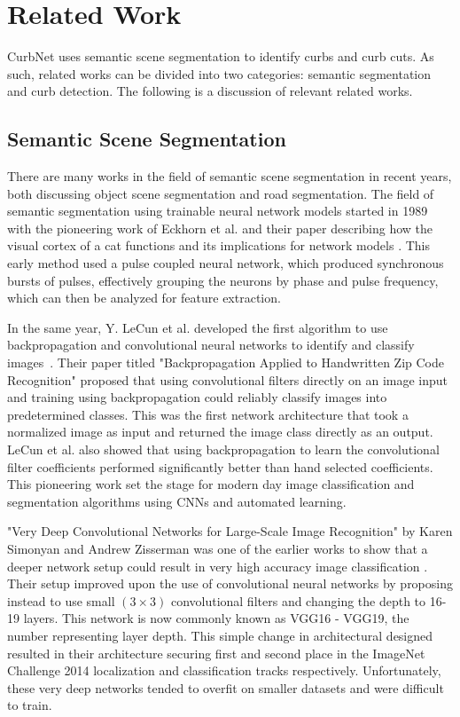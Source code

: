 \chapter{Related Work}\label{chap:relatedwork}
CurbNet uses semantic scene segmentation to identify curbs and curb cuts.
As such, related works can be divided into two categories: semantic segmentation and curb detection.
The following is a discussion of relevant related works.

\section{Semantic Scene Segmentation}\label{section:relatedwork-segmentation}
There are many works in the field of semantic scene segmentation in recent years, both discussing object scene segmentation and road segmentation.
The field of semantic segmentation using trainable neural network models started in 1989 with the pioneering work of Eckhorn et al. and their paper describing how the visual cortex of a cat functions and its implications for network models \cite{eckhorncat}.
This early method used a pulse coupled neural network, which produced synchronous bursts of pulses, effectively grouping the neurons by phase and pulse frequency, which can then be analyzed for feature extraction.

In the same year, Y. LeCun et al. developed the first algorithm to use backpropagation and convolutional neural networks to identify and classify images~\cite{zipcode}.
Their paper titled "Backpropagation Applied to Handwritten Zip Code Recognition" proposed that using convolutional filters directly on an image input and training using backpropagation could reliably classify images into predetermined classes.
This was the first network architecture that took a normalized image as input and returned the image class directly as an output.
LeCun et al. also showed that using backpropagation to learn the convolutional filter coefficients performed significantly better than hand selected coefficients.
This pioneering work set the stage for modern day image classification and segmentation algorithms using CNNs and automated learning.

"Very Deep Convolutional Networks for Large-Scale Image Recognition" by Karen Simonyan and Andrew Zisserman was one of the earlier works to show that a deeper network setup could result in very high accuracy image classification \cite{vgg}.
Their setup improved upon the use of convolutional neural networks by proposing instead to use small $\left(3 \times 3\right)$ convolutional filters and changing the depth to 16-19 layers.
This network is now commonly known as VGG16 - VGG19, the number representing layer depth.
This simple change in architectural designed resulted in their architecture securing first and second place in the ImageNet Challenge 2014 localization and classification tracks respectively.
Unfortunately, these very deep networks tended to overfit on smaller datasets and were difficult to train.

